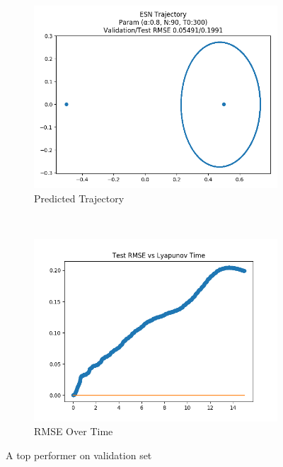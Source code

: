 \documentclass{article}
\begin{document}
\begin{figure}[H]
    \centering
    \begin{subfigure}[b]{0.45\textwidth}
        \includegraphics[width=\textwidth]{doc/paper/images/r3body/rank_2_param_262_fit.png}
        \caption{Predicted Trajectory}
    \end{subfigure}
    ~
    \begin{subfigure}[b]{0.45\textwidth}
        \includegraphics[width=\textwidth]{doc/paper/images/r3body/rank_2_param_262_rmse.png}
        \caption{RMSE Over Time}
    \end{subfigure}
    \caption{A top performer on validation set}
\end{figure}
\end{document}
